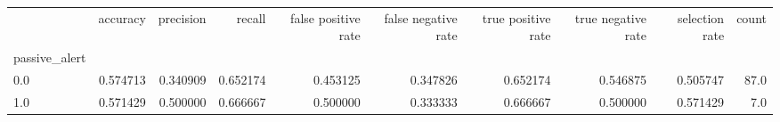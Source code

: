 \begin{tabular}{lrrrrrrrrr}
\toprule
{} &  accuracy &  precision &    recall &  false positive rate &  false negative rate &  true positive rate &  true negative rate &  selection rate &  count \\
passive\_alert &           &            &           &                      &                      &                     &                     &                 &        \\
\midrule
0.0           &  0.574713 &   0.340909 &  0.652174 &             0.453125 &             0.347826 &            0.652174 &            0.546875 &        0.505747 &   87.0 \\
1.0           &  0.571429 &   0.500000 &  0.666667 &             0.500000 &             0.333333 &            0.666667 &            0.500000 &        0.571429 &    7.0 \\
\bottomrule
\end{tabular}
